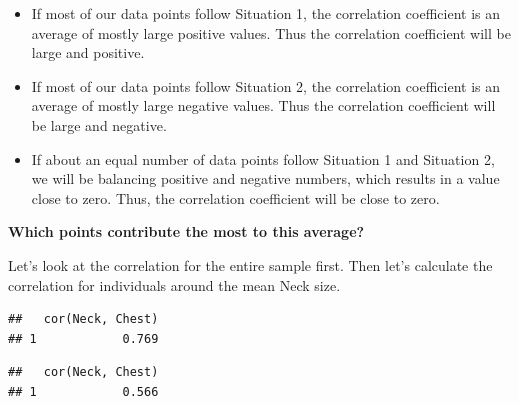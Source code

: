 \documentclass[]{book}
\newenvironment{Shaded}{\begin{snugshade}}{\end{snugshade}}
\newcommand{\CommentTok}[1]{\textcolor[rgb]{0.56,0.35,0.01}{\textit{#1}}}
\newcommand{\DecValTok}[1]{\textcolor[rgb]{0.00,0.00,0.81}{#1}}
\newcommand{\KeywordTok}[1]{\textcolor[rgb]{0.13,0.29,0.53}{\textbf{#1}}}
\newcommand{\NormalTok}[1]{#1}
\newcommand{\OperatorTok}[1]{\textcolor[rgb]{0.81,0.36,0.00}{\textbf{#1}}}
\newcommand{\StringTok}[1]{\textcolor[rgb]{0.31,0.60,0.02}{#1}}
\providecommand{\tightlist}{%
  \setlength{\itemsep}{0pt}\setlength{\parskip}{0pt}}
\begin{document}
\begin{itemize}
\tightlist
\item
  If most of our data points follow Situation 1, the correlation coefficient is an average of mostly large positive values. Thus the correlation coefficient will be large and positive.
\item
  If most of our data points follow Situation 2, the correlation coefficient is an average of mostly large negative values. Thus the correlation coefficient will be large and negative.
\item
  If about an equal number of data points follow Situation 1 and Situation 2, we will be balancing positive and negative numbers, which results in a value close to zero. Thus, the correlation coefficient will be close to zero.
\end{itemize}

\textbf{Which points contribute the most to this average?}

Let's look at the correlation for the entire sample first. Then let's calculate the correlation for individuals around the mean Neck size.

\begin{Shaded}
\end{Shaded}

\begin{verbatim}
##   cor(Neck, Chest)
## 1            0.769
\end{verbatim}

\begin{Shaded}
\end{Shaded}

\begin{verbatim}
##   cor(Neck, Chest)
## 1            0.566
\end{verbatim}
\end{document}
